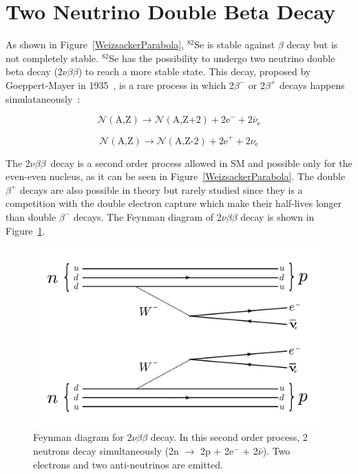 \documentclass[main.tex]{subfiles}
\begin{document}
\section{Two Neutrino Double Beta Decay}\label{sec:2NeutrinoDBD}


\NI As shown in Figure~\ref{WeizsackerParabola}, $^{\text{82}}$Se is stable against $\beta$ decay but is not completely stable. $^{\text{82}}$Se has the possibility to undergo two neutrino double beta decay (2$\nu\beta\beta$) to reach a more stable state. This decay, proposed by Goeppert-Mayer in 1935~\cite{GoeppertMayerDoubleBetaDecay}, is a rare process in which 2$\beta^{-}$ or 2$\beta^{+}$ decays happens simulataneously~: 


\begin{equation}
\mathcal{N} (\text{A,Z}) \rightarrow \mathcal{N} (\text{A,Z+2}) + \text{2e}^- + \text{2}\bar{\nu}_{\text{e}} 
\end{equation}

\begin{equation}
\mathcal{N} (\text{A,Z}) \rightarrow \mathcal{N} (\text{A,Z-2}) + \text{2e}^+ + \text{2}\nu_{\text{e}} 
\end{equation}


\bigskip


\NI The 2$\nu\beta\beta$~decay is a second order process allowed in SM and possible only for the even-even nucleus, as it can be seen in Figure~\ref{WeizsackerParabola}. The double $\beta^{+}$ decays are also possible in theory but rarely studied since they is a competition with the double electron capture which make their half-lives longer than double $\beta^{-}$ decays. The Feynman diagram of 2$\nu\beta\beta$ decay is shown in Figure~\ref{2nubbFeynman}.


\bigskip


\begin{figure}[h!]
\begin{center}
\includegraphics[scale=0.5]{pictures/Chap2/2nubbFeynmanDiagram_v3.pdf}
\caption{Feynman diagram for 2$\nu\beta\beta$ decay. In this second order process, 2 neutrons decay simultaneously (2n $\rightarrow$ 2p + 2e$^-$ + 2$\bar{\nu}$). Two electrons and two anti-neutrinos are emitted.}
\label{2nubbFeynman}
\end{center}
\end{figure}
\end{document}
